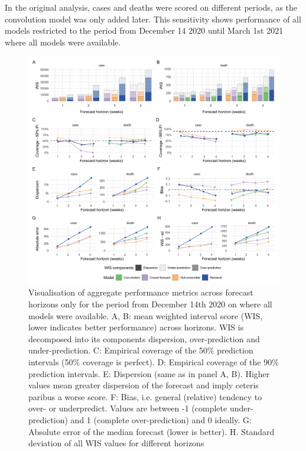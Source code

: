 \documentclass[10pt,letterpaper]{article}
\begin{document}
In the original analysis, cases and deaths were scored on different
periods, as the convolution model was only added later. This sensitivity
shows performance of all models restricted to the period from December
14 2020 until March 1st 2021 where all models were available.

\begin{figure}[H]
\includegraphics[width=1\linewidth,]{../analysis/plots/aggregate-performance-all-late-period-v4} \caption{Visualisation of aggregate performance metrics across forecast horizons only for the period from December 14th 2020 on where all models were available. A, B: mean weighted interval score (WIS, lower indicates better performance) across horizons. WIS is decomposed into its components dispersion, over-prediction and under-prediction. C: Empirical coverage of the 50\% prediction intervals (50\% coverage is perfect). D: Empirical coverage of the 90\% prediction intervals. E: Dispersion (same as in panel A, B). Higher values mean greater dispersion of the forecast and imply ceteris paribus a worse score. F: Bias, i.e. general (relative) tendency to over- or underpredict. Values are between -1 (complete under-prediction) and 1 (complete over-prediction) and 0 ideally. G: Absolute error of the median forecast (lower is better). H. Standard deviation of all WIS values for different horizons}\label{fig:agg-performance-all-late}
\end{figure}
\end{document}
